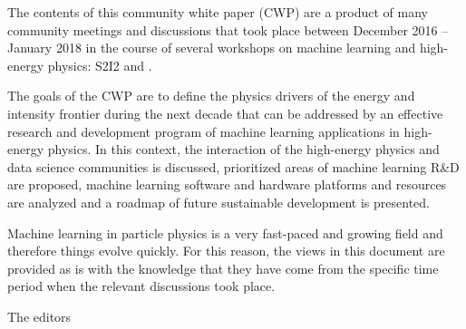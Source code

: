 The contents of this community white paper (CWP) are a product of many community meetings and discussions that took place between December 2016 -- January 2018 in the course of several workshops on machine learning and high-energy physics: S2I2 and \cite{DSatHEP2017,IML2017,ACAT2017,HSF2017}.

The goals of the CWP are to define the physics drivers of the energy and intensity frontier during the next decade that can be addressed by an effective research and development program of machine learning applications in high-energy physics. In this context, the interaction of the high-energy physics and data science communities is discussed, prioritized areas of machine learning R\&D are proposed, machine learning software and hardware platforms and resources are analyzed and a roadmap of future sustainable development is presented.

Machine learning in particle physics is a very fast-paced and growing field and therefore things evolve quickly. For this reason, the views in this document are provided as is with the knowledge that they have come from the specific time period when the relevant discussions took place.

\bigskip

The editors
